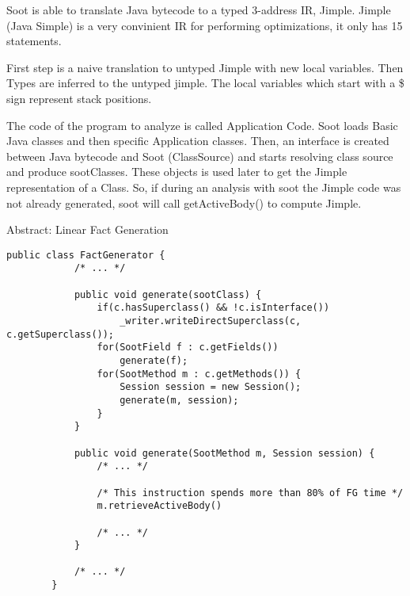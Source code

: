 \documentclass{dithesis}
\begin{document}
        Soot is able to translate Java bytecode to a typed 3-address IR, Jimple.
        Jimple (Java Simple) is a very convinient IR for performing optimizations, it 
        only has 15 statements.

        First step is a naive translation to untyped Jimple with new local variables.
        Then Types are inferred to the untyped jimple. The local variables which start 
        with a \$ sign represent stack positions.
        
        The code of the program to analyze is called Application Code.
        Soot loads Basic Java classes and then specific Application classes.
        Then, an interface is created between Java bytecode and Soot (ClassSource) 
        and starts resolving class source and produce sootClasses.
        These objects is used later to get the Jimple representation of a Class.
        So, if during an analysis with soot the Jimple code was not already
        generated, soot will call getActiveBody() to compute Jimple.



    Abstract: Linear Fact Generation

    \begin{lstlisting}[frame=single] 
        public class FactGenerator {
            /* ... */

            public void generate(sootClass) {
                if(c.hasSuperclass() && !c.isInterface())
                    _writer.writeDirectSuperclass(c, c.getSuperclass());
                for(SootField f : c.getFields())
                    generate(f);
                for(SootMethod m : c.getMethods()) {
                    Session session = new Session();
                    generate(m, session);
                }
            }

            public void generate(SootMethod m, Session session) {
                /* ... */
                
                /* This instruction spends more than 80% of FG time */
                m.retrieveActiveBody() 
                
                /* ... */
            }

            /* ... */
        }
    \end{lstlisting}
\end{document}
